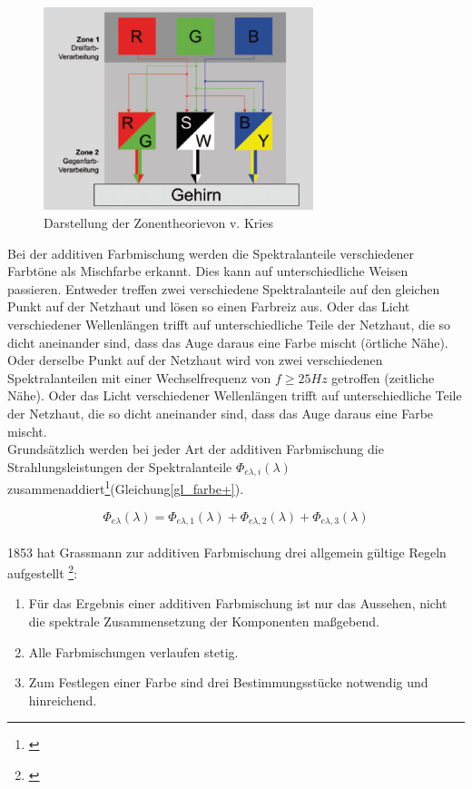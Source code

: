  
\begin{figure}[H]     %
\centering
\includegraphics[width=0.7\textwidth]{bilder/zonen} 
\caption {Darstellung der \glqq Zonentheorie\grqq von v. Kries \protect\footnotemark}\label{b_zonen}
\end{figure}


Bei der additiven Farbmischung werden die Spektralanteile verschiedener Farbtöne als Mischfarbe erkannt. Dies kann auf unterschiedliche Weisen passieren. Entweder treffen zwei verschiedene Spektralanteile auf den gleichen Punkt auf der Netzhaut und lösen so einen Farbreiz aus. Oder das Licht verschiedener Wellenlängen trifft auf unterschiedliche Teile der Netzhaut, die so dicht aneinander sind, dass das Auge daraus eine Farbe mischt (örtliche Nähe). Oder derselbe Punkt auf der Netzhaut wird von zwei verschiedenen Spektralanteilen mit einer Wechselfrequenz von $f\geq25Hz$ getroffen (zeitliche Nähe). Oder das Licht verschiedener Wellenlängen trifft auf unterschiedliche Teile der Netzhaut, die so dicht aneinander sind, dass das Auge daraus eine Farbe mischt.\\
Grundsätzlich werden bei jeder Art der additiven Farbmischung die Strahlungsleistungen der Spektralanteile $\Phi_{e\lambda,i}(\lambda)$ zusammenaddiert\footnote{\cite[83]{greule}}(Gleichung\ref{gl_farbe+}).

	\begin{equation}\label{gl_farbe+}
		\Phi_{e\lambda}(\lambda) = \Phi_{e\lambda,1}(\lambda) + \Phi_{e\lambda,2}(\lambda) + \Phi_{e\lambda,3}(\lambda)
	\end{equation}\\


1853 hat Grassmann zur additiven Farbmischung drei allgemein gültige Regeln aufgestellt \footnote{\cite[105]{hentschel}}: 
\newpage
\begin{enumerate}\setlength{\itemsep}{0ex}
\item Für das Ergebnis einer additiven Farbmischung ist nur das Aussehen, nicht die spektrale Zusammensetzung der Komponenten maßgebend.
\item Alle Farbmischungen verlaufen stetig.
\item Zum Festlegen einer Farbe sind drei Bestimmungsstücke notwendig und hinreichend.
\end{enumerate}

